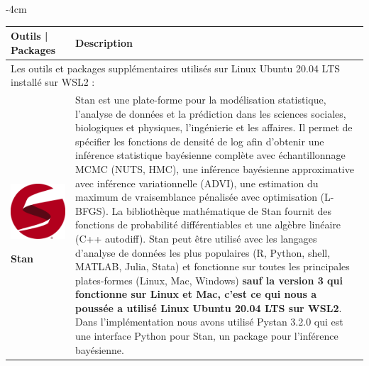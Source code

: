 \newpage

\begin{table}[H]
	\centering
	\addtolength{\leftskip} {-4cm}
	\addtolength{\rightskip}{-4.5cm}
	\begin{tabular}{|m{5cm}|m{14cm}|}
	\hline
	\rowcolor{blueforest}
	\color{white} \textbf{Outils | Packages} & \color{white} \textbf{Description}  \\
	\hline\hline
	\multicolumn{2}{|m{19cm}|}{\centering Les outils et packages supplémentaires utilisés sur Linux Ubuntu 20.04 LTS installé sur WSL2 : }\\ \hline
	\begin{center}
	    \begin{minipage}{.3\textwidth}
      \includegraphics[width=\textwidth]{images/chapitre7/stan.png}
    \end{minipage}
	\end{center}
	\centering \textbf{Stan} & Stan \cite{stan} est une plate-forme pour la modélisation statistique, l’analyse de données et la prédiction dans les sciences sociales, biologiques et physiques, l’ingénierie et les affaires. Il permet de spécifier les fonctions de densité de log afin d’obtenir une inférence statistique bayésienne complète avec échantillonnage MCMC (NUTS, HMC), une inférence bayésienne approximative avec inférence variationnelle (ADVI), une estimation du maximum de vraisemblance pénalisée avec optimisation (L-BFGS). La bibliothèque mathématique de Stan fournit des fonctions de probabilité différentiables et une algèbre linéaire (C++ autodiff). Stan peut être utilisé avec les langages d’analyse de données les plus populaires (R, Python, shell, MATLAB, Julia, Stata) et fonctionne sur toutes les principales plates-formes (Linux, Mac, Windows) \textbf{sauf la version 3 qui fonctionne sur Linux et Mac, c’est ce qui nous a poussée a utilisé Linux Ubuntu 20.04 LTS sur WSL2}. Dans l’implémentation nous avons utilisé Pystan 3.2.0 \cite{pystan} qui est une interface Python pour Stan, un package pour l'inférence bayésienne. \\ \hline

\end{tabular}
\end{table}
